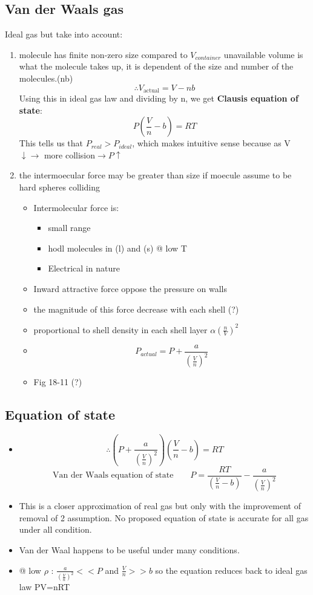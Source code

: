 \documentclass[12 pt, twoside, a4paper] {article}
\begin{document}
\subsection{Van der Waals gas}
Ideal gas but take into account:\begin{enumerate}
\item molecule has finite non-zero size compared to $V_{container}$
unavailable volume is what the molecule takes up, it is dependent of the size and number of the molecules.(nb)
\begin{equation}
\therefore V_{\text{actual}}=V-nb
\end{equation}
Using this in ideal gas law and dividing by n, we get \textbf{Clausis equation of state}:
\begin{equation}
P(\frac{V}{n}-b)=RT
\end{equation}
This tells us that $P_{real}> P_{ideal}$, which makes intuitive sense because as V $\downarrow \rightarrow$ more collision$\rightarrow P \uparrow$
\item the intermoecular force may be greater than size if moecule assume to be hard spheres colliding
\begin{itemize}
\item Intermolecular force is:
\begin{itemize}
\item small range
\item hodl molecules in (l) and (s) @ low T
\item Electrical in nature
\end{itemize}
\item Inward attractive force oppose the pressure on walls
\item the magnitude of this force decrease with each shell (?)

\item proportional to shell density in each shell layer $\alpha (\frac{n}{V})^2 $
\item $$P_{actual}= P+\frac{a}{(\frac{V}{n})^2 }$$
\item Fig 18-11 (?)
\end{itemize}
\end{enumerate}
\subsection{Equation of state}
\begin{itemize}
\item $$\therefore (P+\frac{a}{(\frac{V}{n})^2})(\frac{V}{n}-b)=RT$$
\begin{equation}
\text{Van der Waals equation of state}\quad \quad P=\frac{RT}{(\frac{V}{n}-b)}-\frac{a}{(\frac{V}{n})^2} 
\end{equation}
\item This is a closer approximation of real gas but only with the improvement of removal of 2 assumption. No proposed equation of state is accurate for all gas under all condition. 
\item Van der Waal happens to be useful under many conditions. 
\item @ low $\rho$ : $\frac{a}{(\frac{V}{n})^2}<<P$ and $\frac{V}{n}>>b$ so the equation reduces back to ideal gas law PV=nRT
\end{itemize}
\end{document}
